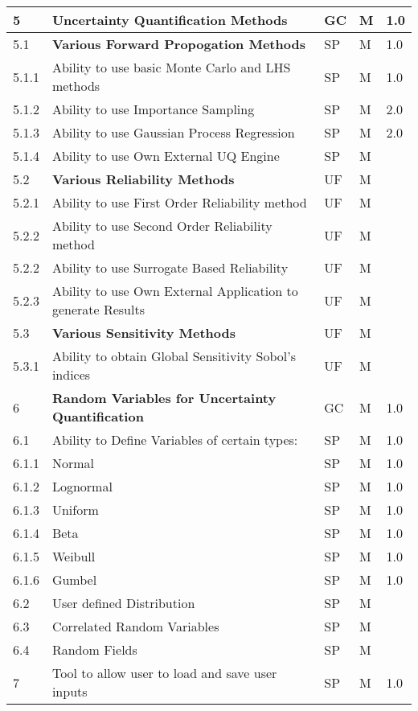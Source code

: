\begin{longtable}{| p{} | p{} | p{} | p{} |  p{} |}
	5 & \textbf{Uncertainty Quantification Methods} &  GC & M & 1.0  \\ \hline
	5.1 & \textbf{Various Forward Propogation Methods} & SP & M & 1.0  \\ \hline
	5.1.1 & Ability to use basic  Monte Carlo and LHS methods & SP & M & 1.0 \\ \hline
	5.1.2 & Ability to use Importance Sampling  & SP & M & 2.0 \\ \hline
	5.1.3 & Ability to use Gaussian Process Regression & SP & M & 2.0 \\ \hline
	5.1.4 & Ability to use Own External UQ Engine & SP & M &  \\ \hline
	5.2 & \textbf{Various Reliability Methods} & UF & M &  \\ \hline
	5.2.1 & Ability to use First Order Reliability method & UF & M &  \\ \hline
	5.2.2 & Ability to use Second Order Reliability method & UF & M & \\ \hline
	5.2.2 & Ability to use Surrogate Based Reliability & UF & M & \\ \hline
	5.2.3 & Ability to use Own External Application to generate Results & UF & M &  \\ \hline
	5.3 & \textbf{Various Sensitivity Methods} & UF & M &  \\ \hline
	5.3.1 & Ability to obtain Global Sensitivity Sobol's indices & UF & M &  \\ \hline
    6 & \textbf{Random Variables for Uncertainty Quantification} & GC & M & 1.0  \\ \hline
    6.1 & Ability to Define Variables of certain types: & SP & M & 1.0  \\ 
    6.1.1 & Normal & SP & M  & 1.0 \\ \hline
    6.1.2 & Lognormal & SP & M & 1.0 \\ \hline
    6.1.3 & Uniform & SP & M & 1.0  \\ \hline
    6.1.4 & Beta & SP & M & 1.0 \\ \hline
    6.1.5 & Weibull &  SP & M  & 1.0 \\ \hline
    6.1.6 & Gumbel &  SP & M & 1.0  \\ \hline
    6.2 & User defined Distribution & SP & M &  \\ \hline
    6.3 & Correlated Random Variables & SP & M &  \\ \hline
    6.4 & Random Fields & SP & M &  \\ \hline
     7 & Tool to allow user to load and save user inputs & SP & M & 1.0 \\ \hline

\end{longtable}
